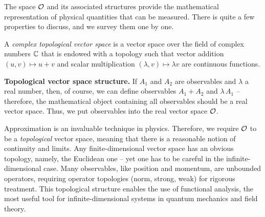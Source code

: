 The space $\mathcal{O}$ and its associated structures provide the mathematical representation of physical quantities that can be measured. There is quite a few properties to discuss, and we survey them one by one.


\begin{definition}
A \textit{complex topological vector space} is a vector space over the field of complex numbers $\mathbb{C}$ that is endowed with a topology such that vector addition $(u,v) \mapsto u+v$ and scalar multiplication $(\lambda, v) \mapsto \lambda v$ are continuous functions.
\end{definition}

\textbf{Topological vector space structure.} If $A_1$ and $A_2$ are observables and $\lambda$ a real number, then, of course, we can define observables $A_1 + A_2$ and $\lambda \, A_1$ -- therefore, the mathematical object containing all observables should be a real vector space. Thus, we put observables into the real vector space $\mathcal{O}$.

Approximation is an invaluable technique in physics. Therefore, we require $\mathcal{O}$ to be a \emph{topological} vector space, meaning that there is a reasonable notion of continuity and limits. Any finite-dimensional vector space has an obvious topology, namely, the Euclidean one -- yet one has to be careful in the infinite-dimensional case. Many observables, like position and momentum, are unbounded operators, requiring operator topologies (norm, strong, weak) for rigorous treatment. This topological structure enables the use of functional analysis, the most useful tool for infinite-dimensional systems in quantum mechanics and field theory.

